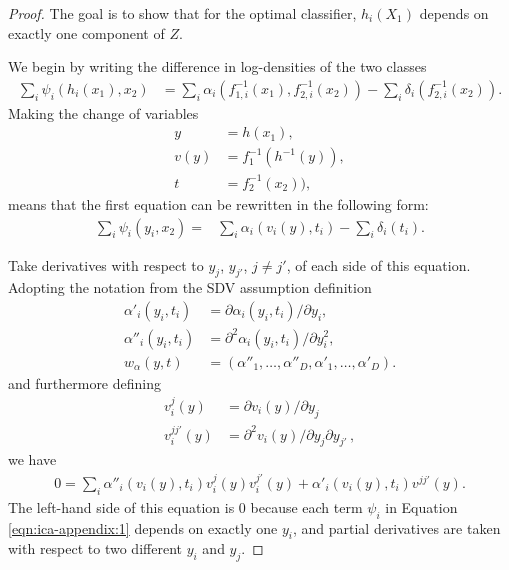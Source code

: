 \begin{proof}

The goal is to show that for the optimal classifier, $h_i(X_1)$ depends on exactly one component of $Z$. 

	
We begin by writing the difference in log-densities of the two classes
	\begin{align*}
	\sum_{i}\psi_{i}(h_{i}(x_{1}),x_{2})  &=\sum_{i}\alpha_{i}({f}_{1,i}^{-1}({x}_{1}), {f}_{2,i}^{-1}({x}_{2})) -\sum_{i}\delta_{i}( {f}_{2,i}^{-1}({x}_{2})).
	\end{align*}
Making the change of variables
	\begin{align*}
	{y} & ={h}({x}_{1}),\\
	{v}({y}) & ={f}_{1}^{-1}({h}^{-1}({y})),\\
	{t} & = {f}_{2}^{-1}({x}_{2})),
	\end{align*}
means that the first equation can be rewritten in the following form:
	\begin{align}
	\sum_{i}\psi_{i}(y_{i},{x}_{2})=&\sum_{i}\alpha_{i}(v_{i}({y}), t_{i}) -\sum_{i}\delta_{i}( t_{i}). \label{eqn:ica-appendix:1}
	\end{align}
	
Take derivatives with respect to $y_j$, $y_{j'}$, $j \neq j'$,  of each side of this equation. 
Adopting the notation from the SDV assumption definition
	\begin{align*}
	\alpha'_{i}(y_i, t_i)&= \partial \alpha_{i}(y_i, t_i)/\partial y_i,\\
	\alpha''_{i}(y_i, t_i)&=\partial^2 \alpha_{i}(y_i, t_i)/\partial y_i^2, \\
	{w}_{\alpha}({y}, {t}) &= (\alpha''_{1}, \ldots, \alpha''_{D}, \alpha'_{1}, \ldots,\alpha'_{D}).
	\end{align*}
 and furthermore defining 
	\begin{align*}
	v^j_i({y})&=\partial v_i({y})/\partial y_j\\
	v^{jj'}_i({y})&= \partial^2 v_i({y})/\partial y_j \partial y_{j'}\,,
	\end{align*}
	we have
	\begin{align*}
	0 = \sum_{i} \alpha''_{i}(v_{i}({y}), t_{i})v^j_i({y})v^{j'}_i({y}) + \alpha'_{i}(v_{i}({y}),  t_{i})v^{jj'}({y}).
	\end{align*}
	The left-hand side of this equation is $0$ because each term $\psi_i$ in Equation \ref{eqn:ica-appendix:1} depends on exactly one $y_i$, and partial derivatives are taken with respect to two different $y_i$ and $y_j$.


\end{proof}
